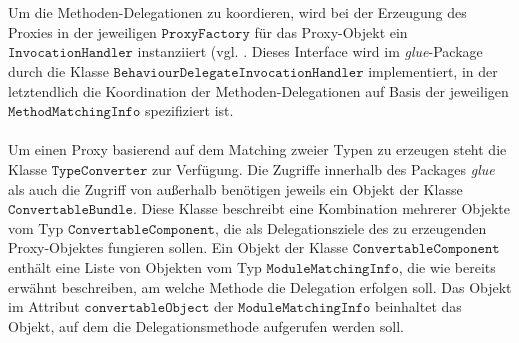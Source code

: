 {{\\\\
Um die Methoden-Delegationen zu koordieren, wird bei der Erzeugung des Proxies in der jeweiligen $\texttt{ProxyFactory}$ für das Proxy-Objekt ein $\texttt{InvocationHandler}$ instanziiert (vgl. \cite{invocationhandler}. Dieses Interface wird im \emph{glue}-Package durch die Klasse $\texttt{BehaviourDelegateInvocationHandler}$ implementiert, in der letztendlich die Koordination der Methoden-Delegationen auf Basis der jeweiligen $\texttt{MethodMatchingInfo}$ spezifiziert ist.
\\\\
Um einen Proxy basierend auf dem Matching zweier Typen zu erzeugen steht die Klasse $\texttt{TypeConverter}$ zur Verfügung. Die Zugriffe innerhalb des Packages \emph{glue} als auch die Zugriff von außerhalb benötigen jeweils ein Objekt der Klasse $\texttt{ConvertableBundle}$. Diese Klasse beschreibt eine Kombination mehrerer Objekte vom Typ $\texttt{ConvertableComponent}$, die als Delegationsziele des zu erzeugenden Proxy-Objektes fungieren sollen. Ein Objekt der Klasse $\texttt{ConvertableComponent}$ enthält eine Liste von Objekten vom Typ $\texttt{ModuleMatchingInfo}$, die wie bereits erwähnt beschreiben, am welche Methode die Delegation erfolgen soll. Das Objekt im Attribut $\texttt{convertableObject}$ der $\texttt{ModuleMatchingInfo}$ beinhaltet das Objekt, auf dem die Delegationsmethode aufgerufen werden soll.

}}
